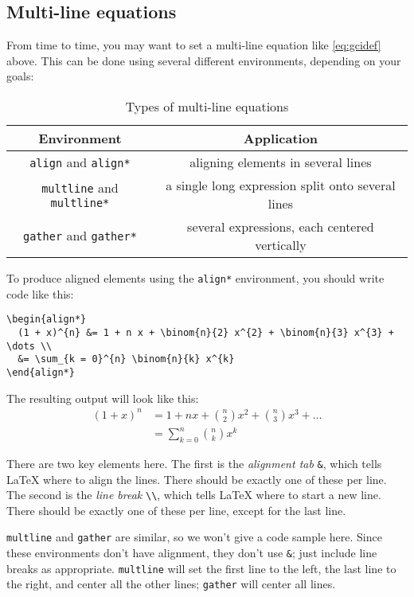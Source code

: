 \documentclass{article}
\newcommand*{\code}[1]{\texttt{#1}}
\begin{document}
\subsection{Multi-line equations}
From time to time, you may want to set a multi-line equation like \cref{eq:gcidef} above.
This can be done using several different environments, depending on your goals:
\begin{table}[htb]
  \centering
  \begin{tabular}{c c}
    \toprule
    Environment & Application \\ \midrule
    \code{align} and \code{align*} & aligning elements in several lines \\
    \code{multline} and \code{multline*} & a single long expression split onto several lines \\
    \code{gather} and \code{gather*} & several expressions, each centered vertically \\
    \bottomrule
  \end{tabular}
  \caption{Types of multi-line equations}
  \label{tab:multiline}
\end{table}

To produce aligned elements using the \code{align*} environment, you should write code like this:
\begin{verbatim}
\begin{align*}
  (1 + x)^{n} &= 1 + n x + \binom{n}{2} x^{2} + \binom{n}{3} x^{3} + \dots \\
  &= \sum_{k = 0}^{n} \binom{n}{k} x^{k}
\end{align*}
\end{verbatim}
The resulting output will look like this:
\begin{align*}
  (1 + x)^{n} &= 1 + n x + \binom{n}{2} x^{2} + \binom{n}{3} x^{3} + \dots \\
  &= \sum_{k = 0}^{n} \binom{n}{k} x^{k}
\end{align*}

There are two key elements here.
The first is the \emph{alignment tab} \code{\&}, which tells \LaTeX{} where to align the lines.
There should be exactly one of these per line.
The second is the \emph{line break} \code{\textbackslash{}\textbackslash{}}, which tells \LaTeX{} where to start a new line.
There should be exactly one of these per line, except for the last line.

\code{multline} and \code{gather} are similar, so we won't give a code sample here.
Since these environments don't have alignment, they don't use \code{\&}; just include line breaks as appropriate.
\code{multline} will set the first line to the left, the last line to the right, and center all the other lines; \code{gather} will center all lines.
\end{document}
